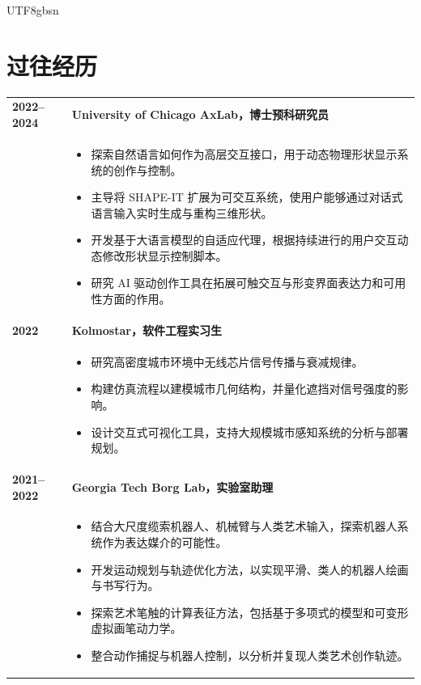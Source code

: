 \documentclass[12pt, letterpaper]{article}
\newlength{\datecolwidth}
\begin{document}
\begin{CJK*}{UTF8}{gbsn}
\section*{过往经历}

\noindent
\begin{tabularx}{\textwidth}{@{}p{\datecolwidth} X@{}}
    \textbf{2022--2024} & \textbf{University of Chicago AxLab，博士预科研究员} \\
    & \begin{itemize}[leftmargin=*, nosep, after=\vspace{4pt}]
        \item 探索自然语言如何作为高层交互接口，用于动态物理形状显示系统的创作与控制。
        \item 主导将 SHAPE-IT 扩展为可交互系统，使用户能够通过对话式语言输入实时生成与重构三维形状。
        \item 开发基于大语言模型的自适应代理，根据持续进行的用户交互动态修改形状显示控制脚本。
        \item 研究 AI 驱动创作工具在拓展可触交互与形变界面表达力和可用性方面的作用。
    \end{itemize} \\

    \textbf{2022} & \textbf{Kolmostar，软件工程实习生} \\
    & \begin{itemize}[leftmargin=*, nosep, after=\vspace{4pt}]
        \item 研究高密度城市环境中无线芯片信号传播与衰减规律。
        \item 构建仿真流程以建模城市几何结构，并量化遮挡对信号强度的影响。
        \item 设计交互式可视化工具，支持大规模城市感知系统的分析与部署规划。
    \end{itemize} \\

    \textbf{2021--2022} & \textbf{Georgia Tech Borg Lab，实验室助理} \\
    & \begin{itemize}[leftmargin=*, nosep, after=\vspace{4pt}]
        \item 结合大尺度缆索机器人、机械臂与人类艺术输入，探索机器人系统作为表达媒介的可能性。
        \item 开发运动规划与轨迹优化方法，以实现平滑、类人的机器人绘画与书写行为。
        \item 探索艺术笔触的计算表征方法，包括基于多项式的模型和可变形虚拟画笔动力学。
        \item 整合动作捕捉与机器人控制，以分析并复现人类艺术创作轨迹。
    \end{itemize} \\


\end{tabularx}
\end{CJK*}
\end{document}
